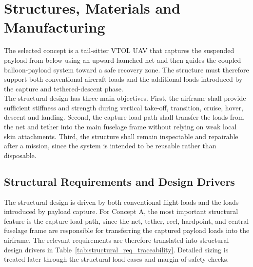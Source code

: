 \chapter{Structures, Materials and Manufacturing}
\label{StructuresCHapter}



The selected concept is a tail-sitter VTOL UAV that captures the suspended payload from below using an upward-launched net and then guides the coupled balloon-payload system toward a safe recovery zone. The structure must therefore support both conventional aircraft loads and the additional loads introduced by the capture and tethered-descent phase. \\

The structural design has three main objectives. First, the airframe shall provide sufficient stiffness and strength during vertical take-off, transition, cruise, hover, descent and landing. Second, the capture load path shall transfer the loads from the net and tether into the main fuselage frame without relying on weak local skin attachments. Third, the structure shall remain inspectable and repairable after a mission, since the system is intended to be reusable rather than disposable. \\

\section{Structural Requirements and Design Drivers}

The structural design is driven by both conventional flight loads and the loads introduced by payload capture. For Concept A, the most important structural feature is the capture load path, since the net, tether, reel, hardpoint, and central fuselage frame are responsible for transferring the captured payload loads into the airframe. The relevant requirements are therefore translated into structural design drivers in Table~\ref{tab:structural_req_traceability}. Detailed sizing is treated later through the structural load cases and margin-of-safety checks.

